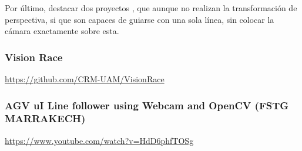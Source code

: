 Por último, destacar dos proyectos , que aunque no realizan la transformación de perspectiva, si que son capaces de guiarse con una sola línea, sin colocar la cámara exactamente sobre esta.

\subsubsection{Vision Race}

\url{https://github.com/CRM-UAM/VisionRace}

\subsubsection{AGV uI Line follower using Webcam and OpenCV (FSTG MARRAKECH)}

\url{https://www.youtube.com/watch?v=HdD6phfTOSg}